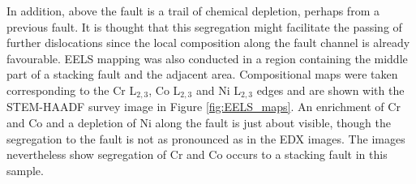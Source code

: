 \documentclass[a4paper,12pt,times,numbered,print,index]{Classes/PhDThesisPSnPDF}
\begin{document}
In addition, above the fault is a trail of chemical depletion, perhaps from a previous fault. It is thought that this segregation might facilitate the passing of further dislocations since the local composition along the fault channel is already favourable.
EELS mapping was also conducted in a region containing the middle part of a stacking fault and the adjacent area. Compositional maps were taken corresponding to the Cr L$_{2,3}$, Co L$_{2,3}$ and Ni L$_{2,3}$ edges and are shown with the STEM-HAADF survey image in Figure \ref{fig:EELS_maps}. An enrichment of Cr and Co and a depletion of Ni along the fault is just about visible, though the segregation to the fault is not as pronounced as in the EDX images. The images nevertheless show segregation of Cr and Co occurs to a stacking fault in this sample.






\end{document}
